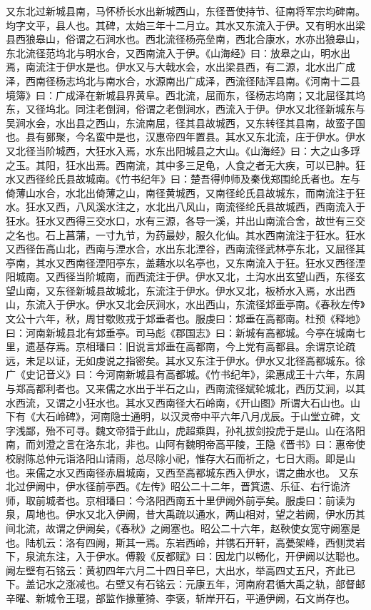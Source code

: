 \documentclass[12pt,UTF8]{ctexbook}
\begin{document}
又东北过新城县南，马怀桥长水出新城西山，东径晋使持节、征南将军宗均碑南。均字文平，县人也。其碑，太始三年十二月立。其水又东流入于伊。又有明水出梁县西狼皋山，俗谓之石涧水也。西北流径杨亮垒南，西北合康水，水亦出狼皋山，东北流径范坞北与明水合，又西南流入于伊。《山海经》曰：放皋之山，明水出焉，南流注于伊水是也。伊水又与大戟水会，水出梁县西，有二源，北水出广成泽，西南径杨志坞北与南水合，水源南出广成泽，西流径陆浑县南。《河南十二县境簿》曰：广成泽在新城县界黄阜。西北流，屈而东，径杨志坞南；又北屈径其坞东，又径坞北。同注老倒涧，俗谓之老倒涧水，西流入于伊。伊水又北径新城东与吴涧水会，水出县之西山，东流南屈，径其县故城西，又东转径其县南，故蛮子国也。县有鄤聚，今名蛮中是也，汉惠帝四年置县。其水又东北流，庄于伊水。伊水又北径当阶城西，大狂水入焉，水东出阳城县之大山。《山海经》曰：大之山多琈之玉。其阳，狂水出焉。西南流，其中多三足龟，人食之者无大疾，可以已肿。狂水又西径纶氏县故城南。《竹书纪年》曰：楚吾得帅师及秦伐郑围纶氏者也。左与倚薄山水合，水北出倚薄之山，南径黄城西，又南径纶氏县故城东，而南流注于狂水。狂水又西，八风溪水注之，水北出八风山，南流径纶氏县故城西，西南流入于狂水。狂水又西得三交水口，水有三源，各导一溪，并出山南流合舍，故世有三交之名也。石上菖蒲，一寸九节，为药最妙，服久化仙。其水西南流注于狂水。狂水又西径缶高山北，西南与湮水合，水出东北湮谷，西南流径武林亭东北，又屈径其亭南，其水又西南径湮阳亭东，盖藉水以名亭也，又东南流入于狂。狂水又西径湮阳城南。又西径当阶城南，而西流注于伊。伊水又北，土沟水出玄望山西，东径玄望山南，又东径新城县故城北，东流注于伊水。伊水又北，板桥水入焉，水出西山，东流入于伊水。伊水又北会厌涧水，水出西山，东流径邥垂亭南。《春秋左传》文公十六年，秋，周甘歜败戎于邥垂者也。服虔曰：邥垂在高都南。杜预《释地》曰：河南新城县北有邥垂亭。司马彪《郡国志》曰：新城有高都城。今亭在城南七里，遗基存焉。京相璠曰：旧说言邥垂在高都南，今上党有高都县。余谓京论疏远，未足以证，无如虔说之指密矣。其水又东注于伊水。伊水又北径高都城东。徐广《史记音义》曰：今河南新城县有高都城。《竹书纪年》，梁惠成王十六年，东周与郑高都利者也。又来儒之水出于半石之山，西南流径斌轮城北，西历艾涧，以其水西流，又谓之小狂水也。其水又西南径大石岭南，《开山图》所谓大石山也。山下有《大石岭碑》，河南隐士通明，以汉灵帝中平六年八月戊辰。于山堂立碑，文字浅鄙，殆不可寻。魏文帝猎于此山，虎超乘舆，孙礼拔剑投虎于是山。山在洛阳南，而刘澄之言在洛东北，非也。山阿有魏明帝高平陵，王隐《晋书》曰：惠帝使校尉陈总仲元诣洛阳山请雨，总尽除小祀，惟存大石而祈之，七日大雨。即是山也。来儒之水又西南径赤眉城南，又西至高都城东西入伊水，谓之曲水也。
又东北过伊阙中，伊水径前亭西。《左传》昭公二十二年，晋箕遗、乐征、右行诡济师，取前城者也。京相璠曰：今洛阳西南五十里伊阙外前亭矣。服虔曰：前读为泉，周地也。伊水又北入伊阙，昔大禹疏以通水，两山相对，望之若阙，伊水历其间北流，故谓之伊阙矣，《春秋》之阙塞也。昭公二十六年，赵鞅使女宽守阙塞是也。陆机云：洛有四阙，斯其一焉。东岩西岭，并镌石开轩，高甍架峰，西侧灵岩下，泉流东注，入于伊水。傅毅《反都赋》曰：因龙门以畅化，开伊阙以达聪也。阙左壁有石铭云：黄初四年六月二十四日辛巳，大出水，举高四丈五尺，齐此已下。盖记水之涨减也。右壁又有石铭云：元康五年，河南府君循大禹之轨，部督邮辛曜、新城令王琨，部监作掾董猗、李褒，斩岸开石，平通伊阙，石文尚存也。
\end{document}
